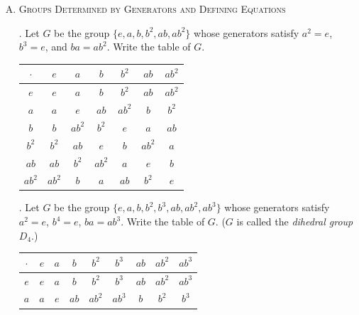 \documentclass[twoside]{amsart}
\begin{document}
\begin{enumerate}[A.]
    \item \textsc{Groups Determined by Generators and Defining Equations}

    . Let $G$ be the group $\{e,a,b,b^2,ab,ab^2\}$ whose 
    generators satisfy $a^2 = e$, $b^3 = e$, and $ba = ab^2$.
    Write the table of $G$.

    \begin{center}
    \begin{tabular}{c|cccccc}
    $\cdot$ & $e$    & $a$    & $b$    & $b^2$  & $ab$   & $ab^2$ \\ \hline
     $e$    & $e$    & $a$    & $b$    & $b^2$  & $ab$   & $ab^2$ \\
     $a$    & $a$    & $e$    & $ab$   & $ab^2$ & $b$    & $b^2$  \\
     $b$    & $b$    & $ab^2$ & $b^2$  & $e$    & $a$    & $ab$   \\

     $b^2$  & $b^2$  & $ab$   & $e$    & $b$    & $ab^2$ & $a$    \\

     $ab$   & $ab$   & $b^2$  & $ab^2$ & $a$    & $e$    & $b$    \\

     $ab^2$ & $ab^2$ & $b$    & $a$    & $ab$   & $b^2$  & $e$ 
    \end{tabular}
    \end{center}

    . Let $G$ be the group $\{e, a, b, b^2, b^3, ab,
    ab^2, ab^3 \}$ whose generators satisfy $a^2=e$, $b^4=e$,
    $ba=ab^3$. Write the table of $G$. ($G$ is called the \emph{dihedral
    group} $D_4$.)

    \begin{center}
    \begin{tabular}{c|cccccccc}
    $\cdot$ & $e$ & $a$ & $b$ & $b^2$ & $b^3$ & $ab$ & $ab^2$ & $ab^3$ \\\hline

    $e$ & $e$ & $a$ & $b$ & $b^2$ & $b^3$ & $ab$ & $ab^2$ & $ab^3$ \\

    $a$ & $a$ & $e$ & $ab$ & $ab^2$ & $ab^3$ & $b$ & $b^2$ & $b^3$ \\


\end{tabular}
\end{center}
\end{enumerate}
\end{document}
